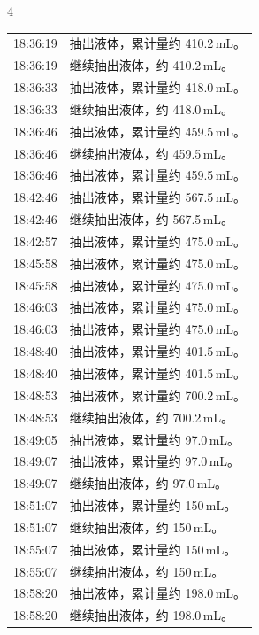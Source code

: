 \documentclass[UTF8,10pt,a4paper,fontset=fandol]{ctexart}
\newcommand{\handwritten}[1]{#1}
\begin{document}

\newpage

\handwritten{4}

\small
\begin{tabularx}{\textwidth}{@{}p{}X@{}}
18:36:19 & 抽出液体，累计量约 410.2\,mL。\\
18:36:19 & 继续抽出液体，约 410.2\,mL。\\
18:36:33 & 抽出液体，累计量约 418.0\,mL。\\
18:36:33 & 继续抽出液体，约 418.0\,mL。\\
18:36:46 & 抽出液体，累计量约 459.5\,mL。\\
18:36:46 & 继续抽出液体，约 459.5\,mL。\\
18:36:46 & 抽出液体，累计量约 459.5\,mL。\\
18:42:46 & 抽出液体，累计量约 567.5\,mL。\\
18:42:46 & 继续抽出液体，约 567.5\,mL。\\
18:42:57 & 抽出液体，累计量约 475.0\,mL。\\
18:45:58 & 抽出液体，累计量约 475.0\,mL。\\
18:45:58 & 抽出液体，累计量约 475.0\,mL。\\
18:46:03 & 抽出液体，累计量约 475.0\,mL。\\
18:46:03 & 抽出液体，累计量约 475.0\,mL。\\
18:48:40 & 抽出液体，累计量约 401.5\,mL。\\
18:48:40 & 抽出液体，累计量约 401.5\,mL。\\
18:48:53 & 抽出液体，累计量约 700.2\,mL。\\
18:48:53 & 继续抽出液体，约 700.2\,mL。\\
18:49:05 & 抽出液体，累计量约 97.0\,mL。\\
18:49:07 & 抽出液体，累计量约 97.0\,mL。\\
18:49:07 & 继续抽出液体，约 97.0\,mL。\\
18:51:07 & 抽出液体，累计量约 150\,mL。\\
18:51:07 & 继续抽出液体，约 150\,mL。\\
18:55:07 & 抽出液体，累计量约 150\,mL。\\
18:55:07 & 继续抽出液体，约 150\,mL。\\
18:58:20 & 抽出液体，累计量约 198.0\,mL。\\
18:58:20 & 继续抽出液体，约 198.0\,mL。\\
\end{tabularx}
\end{document}
